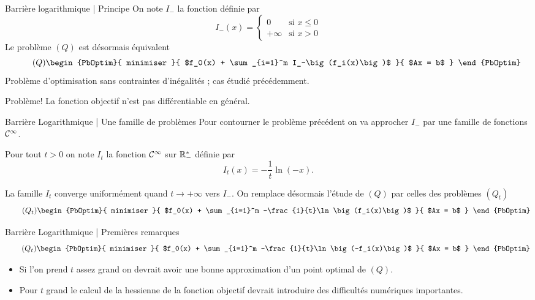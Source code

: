 \documentclass[aspectratio = 169]{beamer}
\begin{document}
\begin{frame}{Barrière logarithmique | Principe}
  On note $I_-$ la fonction définie par
  \[
    I_-(x) = \left\{
      \begin{array}{cr}
        0 & \textrm{si $x \leq 0$} \\
        +\infty  & \textrm{si $x > 0$}
      \end{array}
    \right.
  \]
  Le problème $(Q)$ est désormais équivalent
  \begin{equation}
    \label{QSansContrainteI}
    \tag{$Q$}
    \begin{PbOptim}{
        minimiser
      }{
        $f_0(x) + \sum_{i=1}^m I_-\big(f_i(x)\big)$
      }{
        $Ax = b$
      }
    \end{PbOptim}
  \end{equation}
  Problème d'optimisation sans contraintes d'inégalités ; cas étudié
  précédemment. \pause
  \begin{alertblock}{Problème!}
    La fonction objectif n'est pas différentiable en général.
  \end{alertblock}
\end{frame}

\begin{frame}{Barrière Logarithmique | Une famille de problèmes}
  Pour contourner le problème précédent on va approcher $I_-$ par une
  famille de fonctions $\mathcal{C}^\infty$.
  \begin{defn}
    Pour tout $t > 0$ on note $I_t$ la fonction $\mathcal{C}^\infty$ sur
    $\mathbb{R}_-^*$ définie par
    \[
      I_t(x) = - \frac{1}{t}\ln(-x).
    \]
  \end{defn}
  \pause La famille $I_t$ converge uniformément quand $t \to +\infty$
  vers $I_-$. \pause On remplace désormais l'étude de $(Q)$ par celles
  des problèmes $(Q_t)$
  \begin{equation}
    \label{Qt}
    \tag{$Q_t$}
    \begin{PbOptim}{
        minimiser
      }{
        $f_0(x) + \sum_{i=1}^m -\frac{1}{t}\ln\big(f_i(x)\big)$
      }{
        $Ax = b$
      }
    \end{PbOptim}
  \end{equation}
\end{frame}

\begin{frame}{Barrière Logarithmique | Premières remarques}
  \begin{equation}
    \label{Qtb}
    \tag{$Q_t$}
    \begin{PbOptim}{
        minimiser
      }{
        $f_0(x) + \sum_{i=1}^m -\frac{1}{t}\ln\big(-f_i(x)\big)$
      }{
        $Ax = b$
      }
    \end{PbOptim}
  \end{equation}
  \begin{itemize}
  \item<1-> Si l'on prend $t$ assez grand on devrait avoir une bonne
    approximation d'un point optimal de $(Q)$.
  \item<2-> Pour $t$ grand le calcul de la hessienne de la fonction
    objectif devrait introduire des difficultés numériques
    importantes.
  \end{itemize}
\end{frame}
\end{document}
